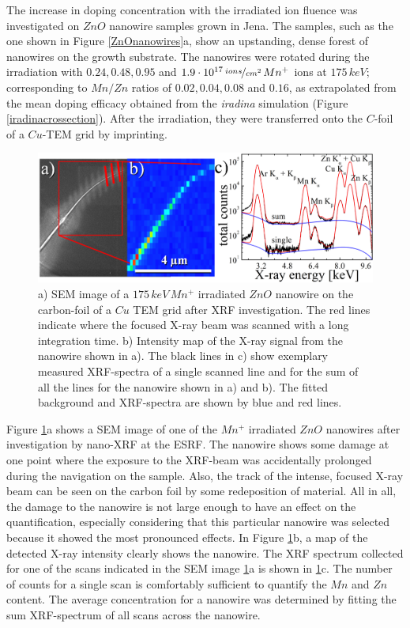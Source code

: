 The increase in doping concentration with the irradiated ion fluence was investigated on $ZnO$ nanowire samples grown in Jena. The samples, such as the one shown in Figure \ref{ZnOnanowires}a, show an upstanding, dense forest of nanowires on the growth substrate. The nanowires were rotated during the irradiation with $0.24, 0.48, 0.95$ and $1.9\cdot 10^{17}\,\nicefrac{ions}{cm^2}\,Mn^+$ ions at $175\,keV$; corresponding to $Mn/Zn$ ratios of $0.02, 0.04, 0.08$ and $0.16$, as extrapolated from the mean doping efficacy obtained from the \emph{iradina} simulation (Figure \ref{iradinacrossection}). After the irradiation, they were transferred onto the $C$-foil of a $Cu$-TEM grid by imprinting.

\begin{figure}[h]
	\centering
		\includegraphics[width=.8\textwidth]{images/XRFSEM.jpg}
	\caption{a) SEM image of a $175\,keV\,Mn^+$ irradiated $ZnO$ nanowire on the carbon-foil of a $Cu$ TEM grid after XRF investigation. The red lines indicate where the focused X-ray beam was scanned with a long integration time. b) Intensity map of the X-ray signal from the nanowire shown in a). The black lines in c) show exemplary measured XRF-spectra of a single scanned line and for the sum of all the lines for the nanowire shown in a) and b). The fitted background and XRF-spectra are shown by blue and red lines.} 
	\label{XRFSEM}
\end{figure} 


Figure \ref{XRFSEM}a shows a SEM image of one of the $Mn^+$ irradiated $ZnO$ nanowires after investigation by nano-XRF at the ESRF. The nanowire shows some damage at one point where the exposure to the XRF-beam was accidentally prolonged during the navigation on the sample. Also, the track of the intense, focused X-ray beam can be seen on the carbon foil by some redeposition of material. All in all, the damage to the nanowire is not large enough to have an effect on the quantification, especially considering that this particular nanowire was selected because it showed the most pronounced effects. In Figure \ref{XRFSEM}b, a map of the detected X-ray intensity clearly shows the nanowire. The XRF spectrum collected for one of the scans indicated in the SEM image \ref{XRFSEM}a is shown in \ref{XRFSEM}c. The number of counts for a single scan is comfortably sufficient to quantify the $Mn$ and $Zn$ content. The average concentration for a nanowire was determined by fitting the sum XRF-spectrum of all scans across the nanowire.




